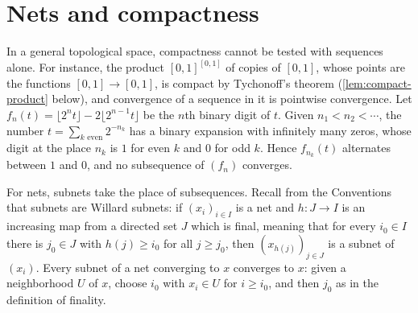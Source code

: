 \section{Nets and compactness}
\label{sec:nets-compactness}
In a general topological space, compactness cannot be tested with sequences alone. For instance, the product $[0,1]^{[0,1]}$ of copies of $[0,1]$, whose points are the functions $[0,1]\to[0,1]$, is compact by Tychonoff's theorem (\cref{lem:compact-product} below), and convergence of a sequence in it is pointwise convergence. Let $f_n(t)=\lfloor2^nt\rfloor-2\lfloor2^{n-1}t\rfloor$ be the $n$th binary digit of $t$. Given $n_1<n_2<\cdots$, the number $t=\sum_{k\text{ even}}2^{-n_k}$ has a binary expansion with infinitely many zeros, whose digit at the place $n_k$ is $1$ for even $k$ and $0$ for odd $k$. Hence $f_{n_k}(t)$ alternates between $1$ and $0$, and no subsequence of $(f_n)$ converges.

For nets, subnets take the place of subsequences. Recall from the Conventions that subnets are Willard subnets: if $(x_i)_{i\in I}$ is a net and $h\colon J\to I$ is an increasing map from a directed set $J$ which is final, meaning that for every $i_0\in I$ there is $j_0\in J$ with $h(j)\geq i_0$ for all $j\geq j_0$, then $(x_{h(j)})_{j\in J}$ is a subnet of $(x_i)$. Every subnet of a net converging to $x$ converges to $x$: given a neighborhood $U$ of $x$, choose $i_0$ with $x_i\in U$ for $i\geq i_0$, and then $j_0$ as in the definition of finality.

